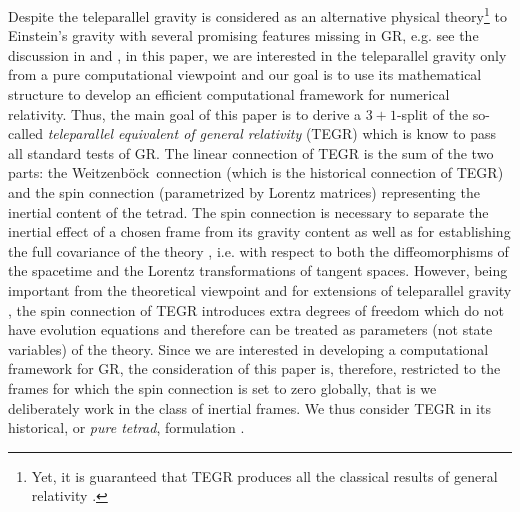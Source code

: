 \documentclass[
10pt, %
a4paper, %
oneside, %
headinclude,footinclude, %
BCOR5mm, %
]{scrartcl}
\newcommand{\We}{Weitzenb\"ock}
\begin{document}
Despite the teleparallel gravity is considered as an alternative physical theory\footnote{Yet, it 
is guaranteed that TEGR produces all the classical results of general relativity 
\cite{AldrovandiPereiraBook,Bahamonde2021a}.} to Einstein's 
gravity with 
several promising features missing in GR, e.g. see the discussion in
\cite[Sec.18]{AldrovandiPereiraBook} and \cite{Cai2016}, in this paper, we are interested in the 
teleparallel gravity 
only
from a pure computational viewpoint and our goal is to use its mathematical structure to 
develop an efficient computational framework for numerical relativity. Thus, the main goal of this 
paper is 
to derive a $ 3+1 $-split of the so-called 
\emph{teleparallel equivalent of general relativity} (TEGR) 
\cite{AldrovandiPereiraBook,Krssak2019} which is know to pass all standard tests of GR. The linear 
connection of TEGR is the sum of the two 
parts: the \We\ connection (which is the historical connection of TEGR) and the spin 
connection (parametrized by Lorentz matrices) representing the inertial content of the tetrad. The 
spin connection is necessary to separate the 
inertial effect of a chosen frame from its gravity content as well as for establishing the full 
covariance of the theory \cite{AldrovandiPereiraBook,Golovnev2017a,Krssak2019}, i.e. with respect 
to both the 
diffeomorphisms of the spacetime and the Lorentz transformations of tangent spaces. However, 
being important from the theoretical viewpoint and for extensions of teleparallel gravity 
\cite{Golovnev2017a}, the spin connection of TEGR introduces extra 
degrees of freedom which do not have evolution equations and therefore can be treated as 
parameters (not state variables) of the theory. Since we are interested in developing a 
computational framework for GR, the consideration of this paper is, therefore, 
restricted to the frames for which the spin connection is set to zero globally, that is we 
deliberately work in the class of inertial frames. We thus consider 
TEGR in its historical, or \emph{pure tetrad}, formulation \cite{Golovnev2017a}.
\end{document}
